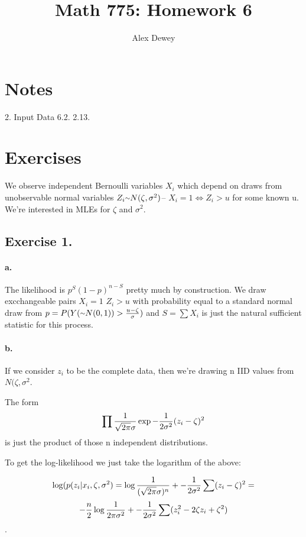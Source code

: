 \documentclass{article}
\newcommand{\mytilde}{\raise.17ex\hbox{$\scriptstyle\mathtt{\sim}$}}
\begin{document}
\title{Math 775: Homework 6}
\author{Alex Dewey}


\maketitle

\section{Notes}

2. Input Data
6.2. 2.13.


\section{Exercises}

We observe independent Bernoulli variables \(X_i\) which depend
on draws from unobservable normal variables \(Z_i \mytilde N(\zeta, \sigma^2)\)--
\(X_i = 1 \iff Z_i > u\) for some known u. We're interested in MLEs for \(\zeta\) and
\(\sigma^2\).

\subsection{Exercise 1.}

\paragraph{a.} The likelihood is \(p^S (1 - p)^{n - S}\) pretty much by construction.
We draw excchangeable pairs \(X_i = 1\) \(Z_i > u\) with probability equal to a standard normal draw from \(p = P(Y (\mytilde N(0,1)) > {u - \zeta\over \sigma})\)
and \(S = \sum X_i\) is just the natural sufficient statistic for this process.

\paragraph{b.}

If we consider \(z_i\) to be the complete data, then we're drawing n IID values from \(N(\zeta, \sigma^2\).

The form \[\prod {1 \over \sqrt{2\pi}\sigma} \exp{-{1 \over 2\sigma^2}(z_i - \zeta)^2}\] is just the 
product of those n independent distributions.

To get the log-likelihood we just take the logarithm of the above:

\[\log(p(z_i \vert x_i, \zeta, \sigma^2) = \log {1 \over (\sqrt{2\pi}\sigma)^n} +  -{1 \over 2\sigma^2} \sum(z_i - \zeta)^2 =\]
\[-{n \over 2} \log {1 \over 2\pi \sigma^2} + -{1 \over 2\sigma^2}\sum(z_i^2 - 2\zeta z_i + \zeta^2) \].
\end{document}
